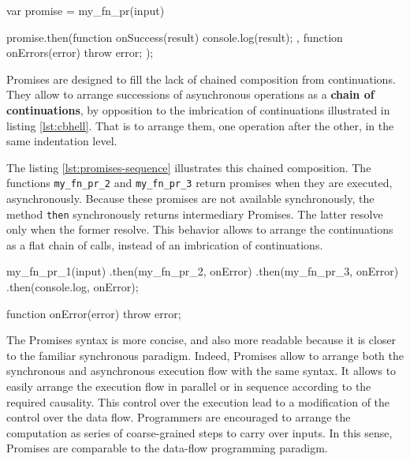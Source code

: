 \begin{code}[js, %
             caption={Example of a promise}, %
             label={lst:then}] %
var promise = my_fn_pr(input)

promise.then(function onSuccess(result) {
  console.log(result);
}, function onErrors(error) {
  throw error;
});
\end{code}

Promises are designed to fill the lack of chained composition from continuations.
They allow to arrange successions of asynchronous operations as a \textbf{chain of continuations}, by opposition to the imbrication of continuations illustrated in listing \ref{lst:cbhell}.
That is to arrange them, one operation after the other, in the same indentation level.

The listing \ref{lst:promises-sequence} illustrates this chained composition.
The functions \texttt{my_fn_pr_2} and \texttt{my_fn_pr_3} return promises when they are executed, asynchronously.
Because these promises are not available synchronously, the method \texttt{then} synchronously returns intermediary Promises.
The latter resolve only when the former resolve.
This behavior allows to arrange the continuations as a flat chain of calls, instead of an imbrication of continuations.

\begin{code}[js, %
             caption={A chain of Promises is more concise than an imbrication of continuations}, %
             label={lst:promises-sequence}] %
my_fn_pr_1(input)
.then(my_fn_pr_2, onError)
.then(my_fn_pr_3, onError)
.then(console.log, onError);

function onError(error) {
  throw error;
}
\end{code}

The Promises syntax is more concise, and also more readable because it is closer to the familiar synchronous paradigm.
Indeed, Promises allow to arrange both the synchronous and asynchronous execution flow with the same syntax.
It allows to easily arrange the execution flow in parallel or in sequence according to the required causality.
This control over the execution lead to a modification of the control over the data flow.
Programmers are encouraged to arrange the computation as series of coarse-grained steps to carry over inputs.
In this sense, Promises are comparable to the data-flow programming paradigm.

